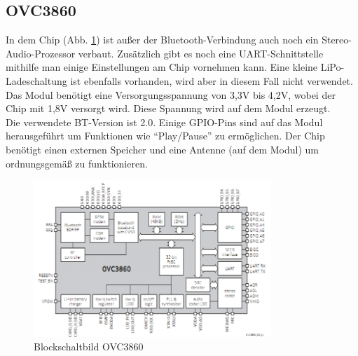 \subsection{OVC3860} \label{subsec:4.1.4}
In dem Chip (Abb. \ref {fig:4.1.4.1}) ist außer der Bluetooth-Verbindung auch noch ein Stereo-Audio-Prozessor verbaut. Zusätzlich gibt es noch eine UART-Schnittstelle mithilfe man einige Einstellungen am Chip vornehmen kann. Eine kleine LiPo-Ladeschaltung ist ebenfalls vorhanden, wird aber in diesem Fall nicht verwendet.\\
Das Modul benötigt eine Versorgungsspannung von 3,3V bis 4,2V, wobei der Chip mit 1,8V versorgt wird. Diese Spannung wird auf dem Modul erzeugt.\\
Die verwendete BT-Version ist 2.0. Einige GPIO-Pins sind auf das Modul herausgeführt um Funktionen wie \enquote{Play/Pause} zu ermöglichen. Der Chip benötigt einen externen Speicher und eine Antenne (auf dem Modul) um ordnungsgemäß zu funktionieren.
\begin{figure} [H]
	\centering
	\includegraphics[width=0.8\textwidth]{img/BTModul/blockschaltbild.png}
	\caption{Blockschaltbild OVC3860}\label {fig:4.1.4.1}
\end{figure}
\newpage

